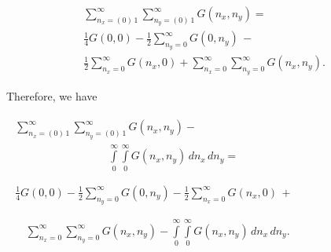 \documentclass[twoside, 10pt, ptm]{article}
\begin{document}
\begin{multicols}{2}
\begin{equation} \label{eq:13}
\begin{array}{c}
    \sum\limits_{n_x=\left(0\right)\,1}^{\infty} \sum\limits_{n_y=\left(0\right)\,1}^{\infty} {G\left(n_x, n_y\right)} = \\
 \frac{1}{4}G\left(0, 0\right) - \frac{1}{2}\sum\limits_{n_y=0}^{\infty}{G\left(0, n_y\right)}\, - \\
\frac{1}{2}\sum\limits_{n_x=0}^{\infty}{G\left(n_x, 0\right)} + \sum\limits_{n_x=0}^{\infty}\sum\limits_{n_y=0}^{\infty}{G\left(n_x, n_y\right)}.
\end{array}
\end{equation}

    Therefore, we have

\noindent
\(\begin{array}{l}
\begin{array}{ll}
\sum\limits_{n_x=\left(0\right)\,1}^{\infty} \sum\limits_{n_y=\left(0\right)\,1}^{\infty} G\left(n_x, n_y\right)
 - \\
\,\,\,\,\,\,\,\,\,\,\,\,\,\,\,\,\,\,\,\,\,\,\,\,\,\,\,\,\,\,\,\,\,\,\,\,\,\,\,\,\,\,\,\,\,\,\,\,\,\,\,\int\limits_{0}^{\infty} \int\limits_{0}^{\infty} G\left(n_x, n_y\right)\,d{n_x}\,d{n_y} = & \, \\
\end{array} \\
\begin{array}{c}
\frac{1}{4}G\left(0, 0\right) -\frac{1}{2}\sum\limits_{n_y=0}^{\infty}{G\left(0, n_y\right)} -\frac{1}{2}\sum\limits_{n_x=0}^{\infty}{G\left(n_x, 0\right)}\, + \\
\end{array} \\
\begin{array}{rr}
\, & \sum\limits_{n_x=0}^{\infty}\sum\limits_{n_y=0}^{\infty}{G\left(n_x, n_y\right)} - \int\limits_{0}^{\infty} \int\limits_{0}^{\infty} G\left(n_x, n_y\right)\,d{n_x}\,d{n_y}.
\end{array}
\end{array}\)


\end{multicols}
\end{document}
